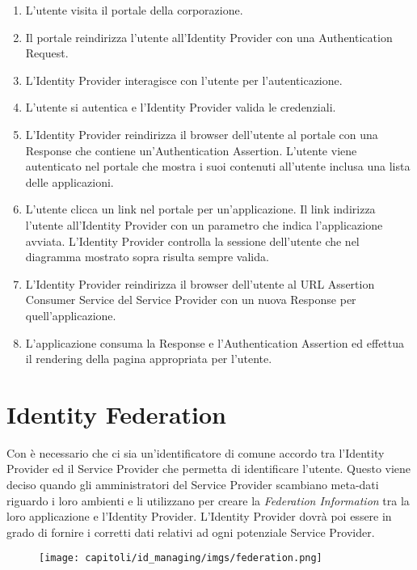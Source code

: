 \begin{enumerate}
      \item L'utente visita il portale della corporazione.
      \item Il portale reindirizza l'utente all'Identity Provider con una \saml{}
            Authentication Request.
      \item L'Identity Provider interagisce con l'utente per l'autenticazione.
      \item L'utente si autentica e l'Identity Provider valida le credenziali.
      \item L'Identity Provider reindirizza il browser dell'utente al portale con
            una \saml{} Response che contiene un'Authentication Assertion. L'utente
            viene autenticato nel portale che mostra i suoi contenuti all'utente
            inclusa una lista delle applicazioni.
      \item L'utente clicca un link nel portale per un'applicazione. Il link
            indirizza l'utente all'Identity Provider con un parametro che indica
            l'applicazione avviata. L'Identity Provider controlla la sessione
            dell'utente che nel diagramma mostrato sopra risulta sempre valida.
      \item L'Identity Provider reindirizza il browser dell'utente al URL Assertion
            Consumer Service del Service Provider con un nuova \saml{} Response per
            quell'applicazione.
      \item L'applicazione consuma la \saml{} Response e l'Authentication Assertion ed
            effettua il rendering della pagina appropriata per l'utente.
\end{enumerate}

\section{Identity Federation}

Con \saml{} è necessario che ci sia un'identificatore di comune accordo tra
l'Identity Provider ed il Service Provider che permetta di identificare l'utente.
Questo viene deciso quando gli amministratori del Service Provider scambiano
meta-dati riguardo i loro ambienti e li utilizzano per creare
la \textit{Federation Information} tra la loro applicazione e l'Identity Provider.
L'Identity Provider dovrà poi essere in grado di fornire i corretti dati relativi
ad ogni potenziale Service Provider.

\begin{figure}[H]
      \centering
      \texttt{[image: capitoli/id\_managing/imgs/federation.png]}
\end{figure}

